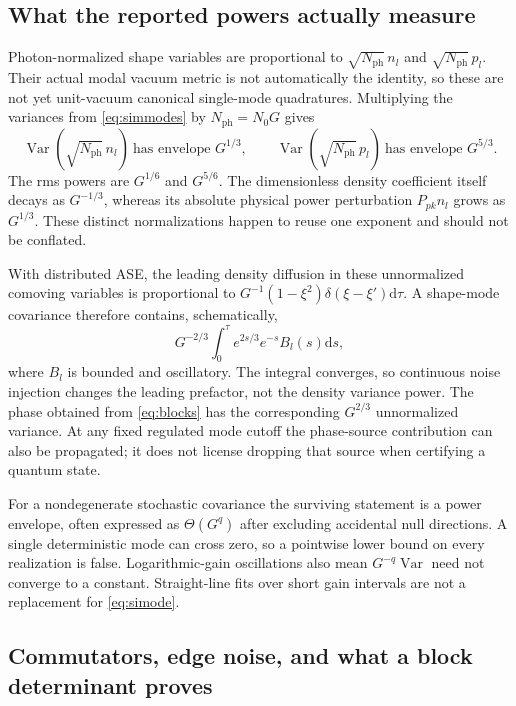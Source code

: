 \documentclass[11pt,a4paper]{article}
\newcommand{\dd}{\mathrm d}
\newcommand{\Var}{\operatorname{Var}}
\newcommand{\Nph}{N_{\mathrm{ph}}}
\begin{document}
\subsection{What the reported powers actually measure}

Photon-normalized shape variables are proportional to $\sqrt{\Nph}\,n_l$ and $\sqrt{\Nph}\,p_l$. Their actual modal vacuum metric is not automatically the identity, so these are not yet unit-vacuum canonical single-mode quadratures. Multiplying the variances from \eqref{eq:simmodes} by $\Nph=N_0G$ gives
\begin{equation}\label{eq:simpowers}
\boxed{\Var(\sqrt{\Nph}\,n_l)\ \text{has envelope }G^{1/3},\qquad
\Var(\sqrt{\Nph}\,p_l)\ \text{has envelope }G^{5/3}.}
\end{equation}
The rms powers are $G^{1/6}$ and $G^{5/6}$. The dimensionless density coefficient itself decays as $G^{-1/3}$, whereas its absolute physical power perturbation $P_{pk}n_l$ grows as $G^{1/3}$. These distinct normalizations happen to reuse one exponent and should not be conflated.

With distributed ASE, the leading density diffusion in these unnormalized comoving variables is proportional to $G^{-1}(1-\xi^2)\delta(\xi-\xi')\dd\tau$. A shape-mode covariance therefore contains, schematically,
\begin{equation}
G^{-2/3}\int_0^\tau e^{2s/3}e^{-s}B_l(s)\dd s,
\end{equation}
where $B_l$ is bounded and oscillatory. The integral converges, so continuous noise injection changes the leading prefactor, not the density variance power. The phase obtained from \eqref{eq:blocks} has the corresponding $G^{2/3}$ unnormalized variance. At any fixed regulated mode cutoff the phase-source contribution can also be propagated; it does not license dropping that source when certifying a quantum state.

For a nondegenerate stochastic covariance the surviving statement is a power envelope, often expressed as $\Theta(G^q)$ after excluding accidental null directions. A single deterministic mode can cross zero, so a pointwise lower bound on every realization is false. Logarithmic-gain oscillations also mean $G^{-q}\Var$ need not converge to a constant. Straight-line fits over short gain intervals are not a replacement for \eqref{eq:simode}.

\subsection{Commutators, edge noise, and what a block determinant proves}
\end{document}
